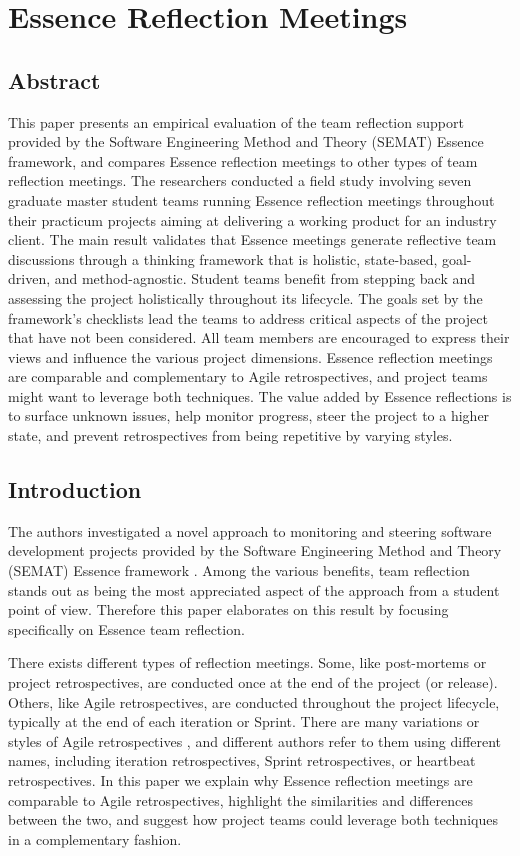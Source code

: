 \chapter{Essence Reflection Meetings}
\section{Abstract}

This paper presents an empirical evaluation of the team reflection support provided by the Software Engineering Method and Theory (SEMAT) Essence framework, and compares Essence reflection meetings to other types of team reflection meetings. The researchers conducted a field study involving seven graduate master student teams running Essence reflection meetings throughout their practicum projects aiming at delivering a working product for an industry client. The main result validates that Essence meetings generate reflective team discussions through a thinking framework that is holistic, state-based, goal- driven, and method-agnostic. Student teams benefit from stepping back and assessing the project holistically throughout its lifecycle. The goals set by the framework's checklists lead the teams to address critical aspects of the project that have not been considered. All team members are encouraged to express their views and influence the various project dimensions. Essence reflection meetings are comparable and complementary to Agile retrospectives, and project teams might want to leverage both techniques. The value added by Essence reflections is to surface unknown issues, help monitor progress, steer the project to a higher state, and prevent retrospectives from being repetitive by varying styles.

\section{Introduction}

The authors investigated a novel approach to monitoring and steering software development projects provided by the Software Engineering Method and Theory (SEMAT) Essence framework \cite{SEMATKernel}. Among the various benefits, team reflection stands out as being the most appreciated aspect of the approach from a student point of view. Therefore this paper elaborates on this result by focusing specifically on Essence team reflection.

There exists different types of reflection meetings. Some, like post-mortems or project retrospectives, are conducted once at the end of the project (or release). Others, like Agile retrospectives, are conducted throughout the project lifecycle, typically at the end of each iteration or Sprint. There are many variations or styles of Agile retrospectives \cite{Derby2006, KuaRetrospectiveHandbook}, and different authors refer to them using different names, including iteration retrospectives, Sprint retrospectives, or heartbeat retrospectives. In this paper we explain why Essence reflection meetings are comparable to Agile retrospectives, highlight the similarities and differences between the two, and suggest how project teams could leverage both techniques in a complementary fashion.

